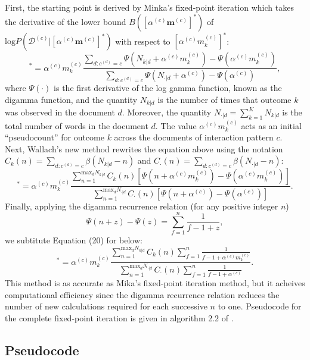 \documentclass[a4paper]{article}
\begin{document}
 \newline First, the starting point is derived by Minka’s fixed-point iteration which takes the derivative of the lower bound $B([\alpha^{(c)}\boldsymbol{m}^{(c)}]^*)$ of $\mbox{log}P(\mathcal{D}^{(c)}|[\alpha^{(c)}\boldsymbol{m}^{(c)}]^*)$ with respect to $[\alpha^{(c)} {m^{(c)}_k}]^*$:
 \begin{equation}
 [\alpha^{(c)} m^{(c)}_k]^*=\alpha^{(c)} m^{(c)}_k\frac{\sum_{d:c^{(d)}=c}\Psi(N_{k|d}+\alpha^{(c)} m^{(c)}_k)-\Psi(\alpha^{(c)} m^{(c)}_k)}{\sum_{d:c^{(d)}=c}\Psi(N_{\cdot|d}+\alpha^{(c)})-\Psi(\alpha^{(c)})},
 \end{equation}
 where $\Psi(\cdot)$ is the first derivative of the log gamma function, known as the digamma function, and the quantity $N_{k|d}$ is the number of times that outcome $k$ was observed in the document $d$. Moreover, the quantity $N_{\cdot|d}=\sum_{k=1}^K N_{k|d}$ is the total number of words in the document $d$. The
 value $\alpha^{(c)} m^{(c)}_k$ acts as an initial “pseudocount” for outcome $k$ across the documents of interaction pattern $c$.\\ \newline
 Next, Wallach's new method rewrites the equation above using the notation $C_k(n)=\sum\limits_{d:c^{(d)}=c}\beta(N_{k|d}-n)$ and $C_\cdot(n)=\sum\limits_{d:c^{(d)}=c}\beta(N_{\cdot|d}-n)$:
 \begin{equation}
 [\alpha^{(c)} m^{(c)}_k]^*=\alpha^{(c)} m^{(c)}_k\frac{\sum_{n=1}^{\mbox{max}_dN_{k|d}}C_k(n)[\Psi(n+\alpha^{(c)} m^{(c)}_k)-\Psi(\alpha^{(c)} m^{(c)}_k)]}{\sum_{n=1}^{\mbox{max}_dN_{\cdot|d}}C_\cdot(n)[\Psi(n+\alpha^{(c)})-\Psi(\alpha^{(c)})]}.
 \end{equation}
 Finally, applying the digamma recurrence relation (for any positive integer $n$) $$\Psi(n+z)-\Psi(z)=\sum_{f=1}^{n}\frac{1}{f-1+z},$$ we subtitute Equation (20) for below:
 \begin{equation}
 [\alpha^{(c)} m^{(c)}_k]^*=\alpha^{(c)} m^{(c)}_k\frac{\sum_{n=1}^{\mbox{max}_dN_{k|d}}C_k(n)\sum_{f=1}^n \frac{1}{f-1+\alpha^{(c)} m^{(c)}_k}}{\sum_{n=1}^{\mbox{max}_dN_{\cdot|d}}C_\cdot(n)\sum_{f=1}^n \frac{1}{f-1+\alpha^{(c)}}}.
 \end{equation}
 This method is as accurate as Mika's fixed-point iteration method, but it acheives computational efficiency since the digamma recurrence relation reduces the number of new calculations required for each successive $n$ to one. Pseudocode
 for the complete fixed-point iteration is given in algorithm 2.2 of \cite{wallach2008structured}. \subsection{Pseudocode}  \label{subsec: Pseudocode}
\end{document}
